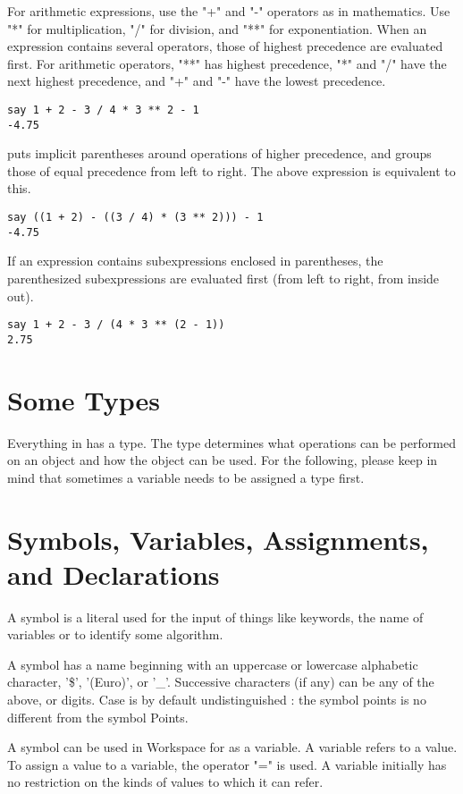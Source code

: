 For arithmetic expressions, use the "+" and "-" operators as in mathematics. Use "*" for multiplication, "/" for division, and "**" for exponentiation. When an expression contains several operators, those of highest precedence are evaluated first. For arithmetic operators, "**" has highest precedence, "*" and "/" have the next highest precedence, and "+" and "-" have the lowest precedence.
\begin{verbatim}
say 1 + 2 - 3 / 4 * 3 ** 2 - 1
-4.75
\end{verbatim}
\nr{} puts implicit parentheses around operations of higher precedence, and groups those of equal precedence from left to right. The above expression is equivalent to this.

\begin{verbatim}
say ((1 + 2) - ((3 / 4) * (3 ** 2))) - 1
-4.75
\end{verbatim}
If an expression contains subexpressions enclosed in parentheses, the parenthesized subexpressions are evaluated first (from left to right, from inside out).

\begin{verbatim}
say 1 + 2 - 3 / (4 * 3 ** (2 - 1))
2.75
\end{verbatim}
\section{Some Types}

Everything in \nr{} has a type. The type determines what operations
can be performed on an object and how the object can be used. For the
following, please keep in mind that sometimes a variable needs to be
assigned a type first.


\section{Symbols, Variables, Assignments, and Declarations}

A symbol is a literal used for the input of things like keywords, the name of variables or to identify some algorithm.

A symbol has a name beginning with an uppercase or lowercase alphabetic character, '\$', '(Euro)', or '\_'. Successive characters (if any) can be any of the above, or digits. Case is by default undistinguished : the symbol points is no different from the symbol Points.

A symbol can be used in Workspace for \nr{} as a variable. A variable refers to a value. To assign a value to a variable, the operator "=" is used. A variable initially has no restriction on the kinds of values to which it can refer.

